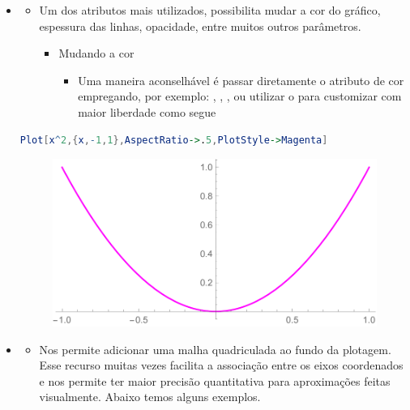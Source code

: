 \documentclass[a4paper, 12pt]{article}
\begin{document}
\begin{itemize}
		\item{} 
			\begin{itemize}
				\item Um dos atributos mais utilizados, possibilita mudar a cor do gráfico, espessura das linhas, opacidade, entre muitos outros parâmetros. 
				\begin{itemize}
					\item Mudando a cor
					\begin{itemize}
						\item Uma maneira aconselhável é passar diretamente o atributo de cor empregando, por exemplo: , , ,  ou utilizar o  para customizar com maior liberdade como segue
					\end{itemize}
				\end{itemize}
			\end{itemize}
		
\begin{lstlisting}[language=Mathematica]
Plot[x^2,{x,-1,1},AspectRatio->.5,PlotStyle->Magenta]
\end{lstlisting}

\begin{figure}[!h]
	\centering
	\includegraphics[scale=.55]{images/magenta}
\end{figure}

		\item{} 
		\begin{itemize}
			\item Nos permite adicionar uma malha quadriculada ao fundo da plotagem. Esse recurso muitas vezes facilita a associação entre os eixos coordenados e nos permite ter maior precisão quantitativa para aproximações feitas visualmente. Abaixo temos alguns exemplos.
		\end{itemize}



\end{itemize}
\end{document}
